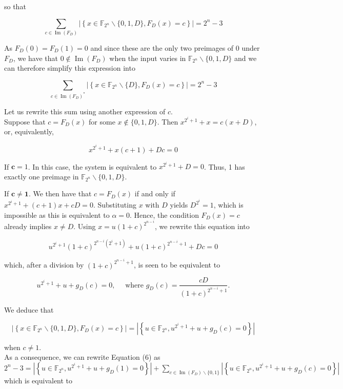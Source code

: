 \documentclass[10pt]{article}
\begin{document}
so that

$$
\sum_{c \in \operatorname{Im}\left(F_{D}\right)}\left|\left\{x \in \mathbb{F}_{2^{n}} \backslash\{0,1, D\}, F_{D}(x)=c\right\}\right|=2^{n}-3
$$

As $F_{D}(0)=F_{D}(1)=0$ and since these are the only two preimages of 0 under $F_{D}$, we have that $0 \notin \operatorname{Im}\left(F_{D}\right)$ when the input varies in $\mathbb{F}_{2^{n}} \backslash\{0,1, D\}$ and we can therefore simplify this expression into


\begin{equation*}
\sum_{c \in \operatorname{Im}\left(F_{D}\right)^{*}}\left|\left\{x \in \mathbb{F}_{2^{n}} \backslash\{D\}, F_{D}(x)=c\right\}\right|=2^{n}-3 \tag{6}
\end{equation*}


Let us rewrite this sum using another expression of $c$.\\
Suppose that $c=F_{D}(x)$ for some $x \notin\{0,1, D\}$. Then $x^{2^{i}+1}+x=c(x+D)$, or, equivalently,

$$
x^{2^{i}+1}+x(c+1)+D c=0
$$

If $\mathbf{c}=1$. In this case, the system is equivalent to $x^{2^{i}+1}+D=0$. Thus, 1 has exactly one preimage in $\mathbb{F}_{2^{n}} \backslash\{0,1, D\}$.

If $\mathbf{c} \neq \mathbf{1}$. We then have that $c=F_{D}(x)$ if and only if $x^{2^{i}+1}+(c+1) x+c D=0$. Substituting $x$ with $D$ yields $D^{2^{i}}=1$, which is impossible as this is equivalent to $\alpha=0$. Hence, the condition $F_{D}(x)=c$ already implies $x \neq D$. Using $x=u(1+c)^{2^{n-i}}$, we rewrite this equation into

$$
u^{2^{i}+1}(1+c)^{2^{n-i}\left(2^{i}+1\right)}+u(1+c)^{2^{n-i}+1}+D c=0
$$

which, after a division by $(1+c)^{2^{n-i}+1}$, is seen to be equivalent to

$$
u^{2^{i}+1}+u+g_{D}(c)=0, \quad \text { where } g_{D}(c)=\frac{c D}{(1+c)^{2^{n-i}+1}} .
$$

We deduce that

$$
\left|\left\{x \in \mathbb{F}_{2^{n}} \backslash\{0,1, D\}, F_{D}(x)=c\right\}\right|=\left|\left\{u \in \mathbb{F}_{2^{n}}, u^{2^{i}+1}+u+g_{D}(c)=0\right\}\right|
$$

when $c \neq 1$.\\
As a consequence, we can rewrite Equation (6) as\\
$2^{n}-3=\left|\left\{u \in \mathbb{F}_{2^{n}}, u^{2^{i}+1}+u+g_{D}(1)=0\right\}\right|+\sum_{c \in \operatorname{Im}\left(F_{D}\right) \backslash\{0,1\}}\left|\left\{u \in \mathbb{F}_{2^{n}}, u^{2^{i}+1}+u+g_{D}(c)=0\right\}\right|$\\
which is equivalent to
\end{document}
